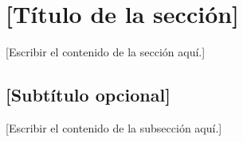 
\section{[T\'itulo de la secci\'on]}

[Escribir el contenido de la secci\'on aqu\'i.]

\subsection{[Subt\'itulo opcional]}

[Escribir el contenido de la subsecci\'on aqu\'i.]


